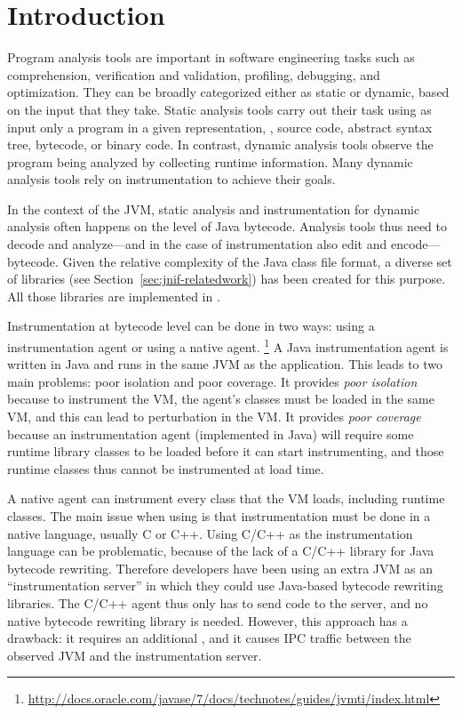 \section{Introduction}\label{sec:jnif-introduction}

Program analysis tools are important in software engineering tasks 
such as comprehension, verification and validation, profiling, debugging, and optimization.
They can be broadly categorized either as static or dynamic,
based on the input that they take.
Static analysis tools carry out their task using as input only a program
in a given representation, \eg{}, source code, abstract syntax tree,
bytecode, or binary code.
In contrast, dynamic analysis tools observe the program being analyzed 
by collecting runtime information.
Many dynamic analysis tools rely on instrumentation to achieve their goals.

In the context of the JVM, 
static analysis and instrumentation for dynamic analysis often happens on the level of Java bytecode.
Analysis tools thus need to decode and analyze---and in the case of instrumentation also edit and encode---\java{} bytecode.
Given the relative complexity of the Java class file format,
a diverse set of libraries (see Section~\ref{sec:jnif-relatedwork}) has been created for this purpose.
All those libraries are implemented in \java{}.

Instrumentation at bytecode level can be done in two ways:
using a \java{} instrumentation agent or using a native \jvmti{} agent.%
\footnote{\url{http://docs.oracle.com/javase/7/docs/technotes/guides/jvmti/index.html}}
A Java instrumentation agent is written in Java and runs in the same JVM as the application.
This leads to two main problems: poor isolation and poor coverage.
It provides \emph{poor isolation} because to instrument the VM, 
the agent's classes must be loaded in the same VM,
and this can lead to perturbation in the VM.
It provides \emph{poor coverage} because 
an instrumentation agent (implemented in Java) will require some runtime library classes to be loaded before it can start instrumenting,
and those runtime classes thus cannot be instrumented at load time. 

A native \jvmti{} agent can instrument every class that the VM loads, including runtime classes. 
The main issue when using \jvmti{} is that instrumentation must be done in a native language, usually C or C++. 
Using C/C++ as the instrumentation language can be problematic, 
because of the lack of a C/C++ library for Java bytecode rewriting. 
Therefore developers have been using an extra JVM as an ``instrumentation server''
in which they could use Java-based bytecode rewriting libraries.
The C/C++ \jvmti{} agent thus only has to send code to the server,
and no native bytecode rewriting library is needed.
However, this approach has a drawback: it requires an additional \jvm{}, 
and it causes IPC traffic between the observed JVM and the instrumentation server.

